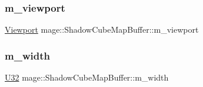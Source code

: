 \subsubsection{\texorpdfstring{m\+\_\+viewport}{m\_viewport}}
{\footnotesize\ttfamily \hyperlink{structmage_1_1_viewport}{Viewport} mage\+::\+Shadow\+Cube\+Map\+Buffer\+::m\+\_\+viewport\hspace{0.3cm}{\ttfamily [private]}}

\hypertarget{structmage_1_1_shadow_cube_map_buffer_a9492f3ff2146a03d30f3f02fd7985aba}{}\label{structmage_1_1_shadow_cube_map_buffer_a9492f3ff2146a03d30f3f02fd7985aba} 
\subsubsection{\texorpdfstring{m\+\_\+width}{m\_width}}
{\footnotesize\ttfamily \hyperlink{namespacemage_a41c104c036fba3756a74e19f793eeaa1}{U32} mage\+::\+Shadow\+Cube\+Map\+Buffer\+::m\+\_\+width\hspace{0.3cm}{\ttfamily [private]}}

